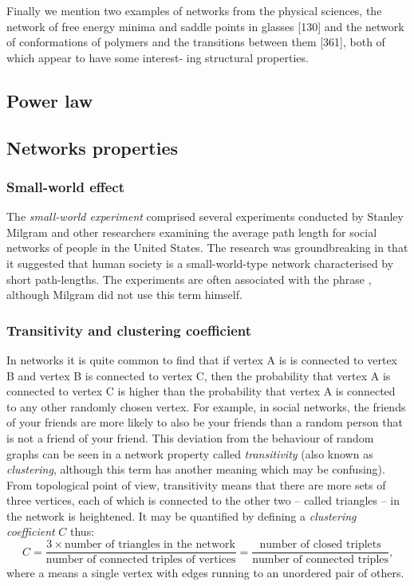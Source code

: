       Finally we mention two examples of networks from the physical sciences, the network of free energy minima and saddle points in glasses [130] and the network of conformations of polymers and the transitions between them [361], both of which appear to have some interest- ing structural properties.
      
  \subsection{Power law}
    
  \subsection{Networks properties}
    
    \subsubsection{Small-world effect}
      
      The \emph{small-world experiment} comprised several experiments conducted by Stanley Milgram and other researchers examining the average path length for social networks of people in the United States. The research was groundbreaking in that it suggested that human society is a small-world-type network characterised by short path-lengths. The experiments are often associated with the phrase , although Milgram did not use this term himself.
      
    \subsubsection{Transitivity and clustering coefficient}
    
      In networks it is quite common to find that if vertex A is is connected to vertex B and vertex B is connected to vertex C, then the probability that vertex A is connected to vertex C is higher than the probability that vertex A is connected to any other randomly chosen vertex. For example, in social networks, the friends of your friends are more likely to also be your friends than a random person that is not a friend of your friend. This deviation from the behaviour of random graphs can be seen in a network property called \emph{transitivity} (also known as \emph{clustering}, although this term has another meaning which may be confusing). From topological point of view, transitivity means that there are more sets of three vertices, each of which is connected to the other two -- called triangles -- in the network is heightened. It may be quantified by defining a \emph{clustering coefficient} $C$ thus:
      \begin{equation}
        C = \frac{3 \times \mbox{number of triangles in the network}}{\mbox{number of connected triples of vertices}} = \frac{\mbox{number of closed triplets}}{\mbox{number of connected triples}} \mbox{,}
      \end{equation}
      where a  means a single vertex with edges running to an unordered pair of others.


